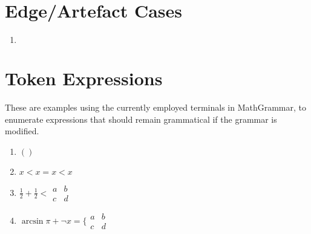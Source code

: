 \documentclass{article}
\def\mockarray{\begin{array}{cc} 
  a & b \\
  c & d \end{array}}
\begin{document}
\section{Edge/Artefact Cases}
\begin{enumerate}
  \item $\,$  %
\end{enumerate}

\section{Token Expressions}

\def\ATOM{\frac{1}{2}}
\def\UNKNOWN{x}
\def\ID{\infty}
\def\ARRAY{\mockarray}
\def\NUMBER{\pi}
\def\PUNCT{,}
\def\PERIOD{.}
\def\RELOP{<}
\def\LANGLE{\langle}
\def\RANGLE{\rangle}
\def\MIDBAR{\bigm{|}}
\def\LBRACE{\{}
\def\RBRACE{\}}
\def\METARELOP{=}
\def\MODIFIEROP{\mod}
\def\MODIFIER{\pod{3}}
\def\ARROW{\uparrow}
\def\ADDOP{+}
\def\MULOP{\times}
\def\FRACOP{/}
\def\BINOP{\mathbin{@}}
\def\POSTFIX{!}
\def\FUNCTION{\neg}
\def\OPFUNCTION{\arcsin}
\def\TRIGFUNCTION{\sin}
\def\APPLYOP{\@APPLYFUNCTION} %
\lxDeclare[role=COMPOSEOP,meaning=compose]{$*$} %
\def\COMPOSEOP{*}
\def\SUPOP{\prime}
\def\OPEN{(}
\def\CLOSE{)}
\def\SCRIPTOPEN{\{}
\def\MIDDLE{\bigm{m}}
\def\VERTBAR{||}
\def\SINGLEVERTBAR{|}
\def\BIGOP{\forall}
\def\SUMOP{\sum}
\def\INTOP{\int}
\def\LIMITOP{\lim}
\def\DIFFOP{d}
\def\OPERATOR{\partial}
\def\POSTSUBSCRIPT{_}
\def\POSTSUPERSCRIPT{^}
\def\FLOATSUBSCRIPT{_}
\def\FLOATSUPERSCRIPT{^}

These are examples using the currently employed terminals in MathGrammar, to enumerate expressions that should remain grammatical if the grammar is modified.

\begin{enumerate}
  \item $\OPEN \CLOSE$
  \item $\UNKNOWN \RELOP \UNKNOWN \METARELOP \UNKNOWN \RELOP \UNKNOWN$
  \item $\ATOM \ADDOP \ATOM \RELOP \ARRAY$
  \item $\OPFUNCTION \NUMBER \ADDOP \FUNCTION \UNKNOWN \METARELOP \LBRACE \ARRAY$


\end{enumerate}
\end{document}

